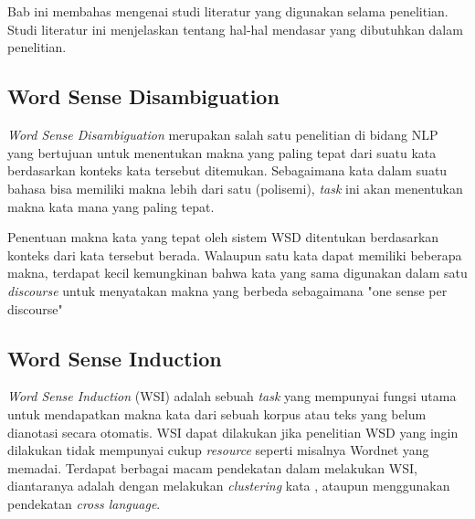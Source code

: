 \chapter{\babDua}
Bab ini membahas mengenai studi literatur yang digunakan selama penelitian. Studi literatur ini menjelaskan tentang hal-hal mendasar yang dibutuhkan dalam penelitian.

\section{Word Sense Disambiguation}
\textit{Word Sense Disambiguation} merupakan salah satu penelitian di bidang NLP yang bertujuan untuk menentukan makna yang paling tepat dari suatu kata berdasarkan konteks kata tersebut ditemukan. Sebagaimana kata dalam suatu bahasa bisa memiliki makna lebih dari satu (polisemi), \textit{task} ini akan menentukan makna kata mana yang paling tepat.

Penentuan makna kata yang tepat oleh sistem WSD ditentukan berdasarkan konteks dari kata tersebut berada. Walaupun satu kata dapat memiliki beberapa makna, terdapat kecil kemungkinan bahwa kata yang sama digunakan dalam satu \textit{discourse} untuk menyatakan makna yang berbeda sebagaimana "one sense per discourse" \citep{gale1992one}

\section{Word Sense Induction}
\textit{Word Sense Induction} (WSI) adalah sebuah \textit{task} yang mempunyai fungsi utama untuk mendapatkan makna kata dari sebuah korpus atau teks yang belum dianotasi secara otomatis. WSI dapat dilakukan jika penelitian WSD yang ingin dilakukan tidak mempunyai cukup \textit{resource} seperti misalnya Wordnet yang memadai. Terdapat berbagai macam pendekatan dalam melakukan WSI, diantaranya adalah dengan melakukan \textit{clustering} kata \citep{denkowski2009survey}, ataupun menggunakan pendekatan \textit{cross language}.
	
